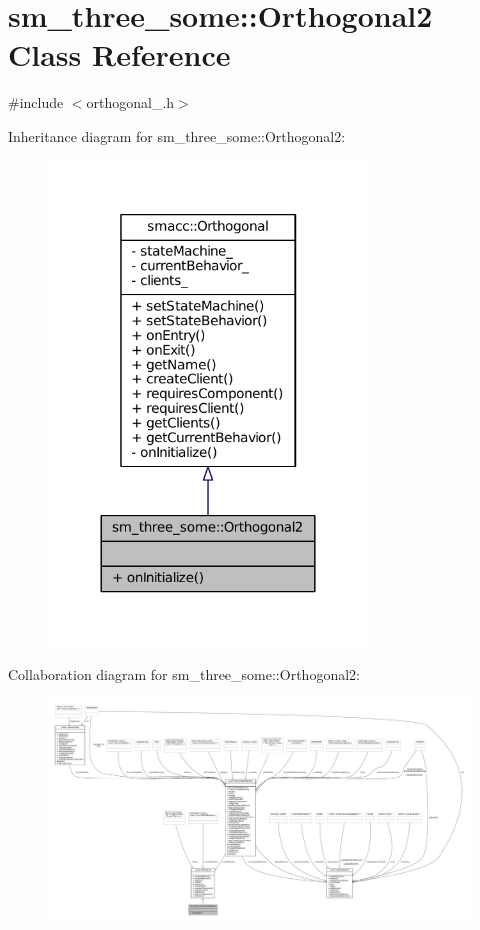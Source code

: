 \hypertarget{classsm__three__some_1_1Orthogonal2}{}\section{sm\+\_\+three\+\_\+some\+:\+:Orthogonal2 Class Reference}
\label{classsm__three__some_1_1Orthogonal2}


{\ttfamily \#include $<$orthogonal\+\_.\+h$>$}



Inheritance diagram for sm\+\_\+three\+\_\+some\+:\+:Orthogonal2\+:
\nopagebreak
\begin{figure}[H]
\begin{center}
\leavevmode
\includegraphics[width=240pt]{classsm__three__some_1_1Orthogonal2__inherit__graph}
\end{center}
\end{figure}


Collaboration diagram for sm\+\_\+three\+\_\+some\+:\+:Orthogonal2\+:
\nopagebreak
\begin{figure}[H]
\begin{center}
\leavevmode
\includegraphics[width=350pt]{classsm__three__some_1_1Orthogonal2__coll__graph}
\end{center}
\end{figure}
